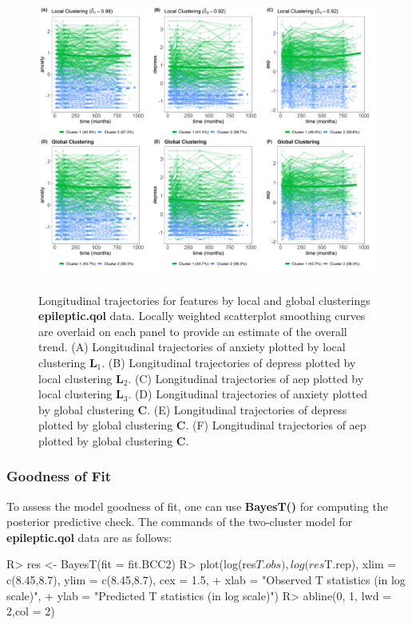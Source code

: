 \begin{figure}[h]
\centering
\includegraphics[width=\textwidth,height=10cm]{./Figures/trajplot.JPEG}
\caption{\label{fig:traj_epileptic_qol} Longitudinal trajectories for features by local and global clusterings \textbf{epileptic.qol} data. Locally weighted scatterplot smoothing curves are overlaid on each panel to provide an estimate of the overall trend. (A) Longitudinal trajectories of anxiety plotted by local clustering $\boldsymbol{L}_1$. (B) Longitudinal trajectories of depress plotted by local clustering $\boldsymbol{L}_2$. (C) Longitudinal trajectories of aep plotted by local clustering $\boldsymbol{L}_3$. (D) Longitudinal trajectories of anxiety plotted by global clustering $\boldsymbol{C}$. (E)  Longitudinal trajectories of depress plotted by global clustering $\boldsymbol{C}$. (F)  Longitudinal trajectories of aep plotted by global clustering $\boldsymbol{C}$.}
\end{figure}

\subsubsection{Goodness of Fit}
To assess the model goodness of fit, one can use \textbf{BayesT()} for computing the posterior predictive check. The commands of the two-cluster model for \textbf{epileptic.qol} data are as follows: 

\begin{example}
R> res <- BayesT(fit = fit.BCC2)
R> plot(log(res$T.obs), log(res$T.rep), xlim = c(8.45,8.7), ylim = c(8.45,8.7), cex = 1.5,
+        xlab = "Observed T statistics (in log scale)", 
+        ylab = "Predicted T statistics (in log scale)")
R> abline(0, 1, lwd = 2,col = 2)
\end{example} 

